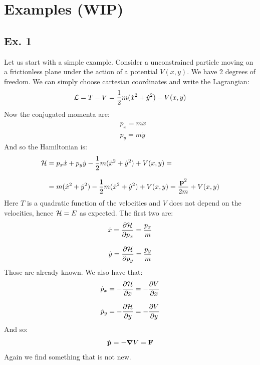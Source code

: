 \section{Examples (WIP)}
\subsection{Ex. 1}
Let us start with a simple example. Consider a unconstrained particle moving on a frictionless plane under the action of a potential $V(x,y)$. We have 2 degrees of freedom. We can simply choose cartesian coordinates and write the Lagrangian:
\begin{equation}
  \mathcal{L} = T - V = \dfrac{1}{2}m(\dot{x}^2+\dot{y}^2) - V(x,y)
\end{equation}
Now the conjugated momenta are:
\begin{equation}
  \begin{split}
    &p_x = m\dot{x} \\[8pt]
    &p_y = m\dot{y}
  \end{split}
\end{equation}
And so the Hamiltonian is:
\begin{equation}
  \begin{split}
    \mathcal{H} &= p_x\dot{x} + p_y\dot{y} - \dfrac{1}{2}m(\dot{x}^2+\dot{y}^2) + V(x,y) =\\[8pt]
    &= m(\dot{x}^2+\dot{y}^2) - \dfrac{1}{2}m(\dot{x}^2+\dot{y}^2) + V(x,y) = \dfrac{\vb{p}^2}{2m} + V(x,y)
  \end{split}
\end{equation}
Here $T$ is a quadratic function of the velocities and $V$ does not depend on the velocities, hence $\mathcal{H} = E$ as expected. The first two \hamiltonref\;are:
\begin{equation}
  \begin{split}
    \dot{x} = \pdv{\hamfun}{p_x} = \dfrac{p_x}{m} \\[8pt]
    \dot{y} = \pdv{\hamfun}{p_y} = \dfrac{p_y}{m}
  \end{split}
\end{equation}
Those are already known. We also have that:
\begin{equation}
  \begin{split}
    \dot{p}_x = -\pdv{\hamfun}{x} = -\pdv{V}{x} \\[8pt]
    \dot{p}_y = -\pdv{\hamfun}{y} = -\pdv{V}{y}
  \end{split}
\end{equation}
And so:
\begin{equation}
  \dot{\vb{p}} = -\grad{V} = \vb{F}
\end{equation}
Again we find something that is not new.\\

